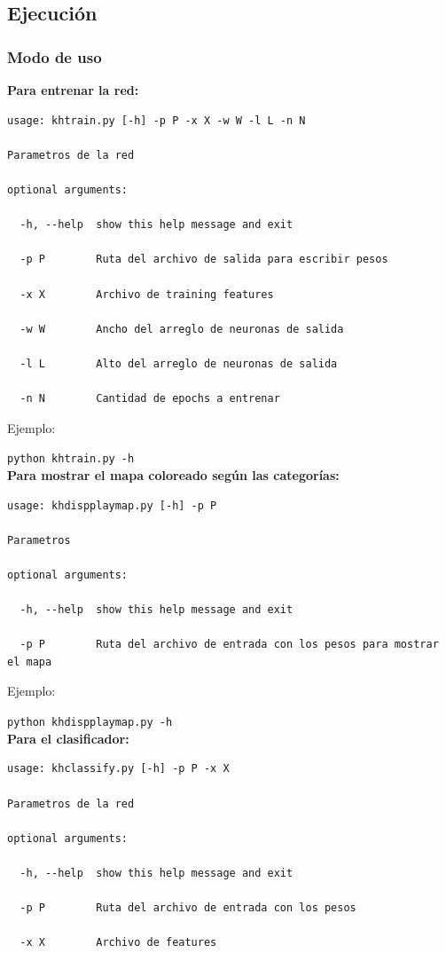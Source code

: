 \subsection{Ejecución}

\subsubsection{Modo de uso}

\textbf{Para entrenar la red:}

\begin{lstlisting}[style=bash]
usage: khtrain.py [-h] -p P -x X -w W -l L -n N

Parametros de la red

optional arguments:

  -h, --help  show this help message and exit

  -p P        Ruta del archivo de salida para escribir pesos

  -x X        Archivo de training features

  -w W        Ancho del arreglo de neuronas de salida

  -l L        Alto del arreglo de neuronas de salida

  -n N        Cantidad de epochs a entrenar
\end{lstlisting}

Ejemplo: 

\noindent\texttt{python khtrain.py -h} \\

\textbf{Para mostrar el mapa coloreado según las categorías:}

\begin{lstlisting}[style=bash]
usage: khdispplaymap.py [-h] -p P

Parametros

optional arguments:

  -h, --help  show this help message and exit

  -p P        Ruta del archivo de entrada con los pesos para mostrar el mapa

\end{lstlisting}

Ejemplo:

\noindent\texttt{python khdispplaymap.py -h} \\


\textbf{Para el clasificador:}

\begin{lstlisting}[style=bash]
usage: khclassify.py [-h] -p P -x X

Parametros de la red

optional arguments:

  -h, --help  show this help message and exit

  -p P        Ruta del archivo de entrada con los pesos

  -x X        Archivo de features
\end{lstlisting}

